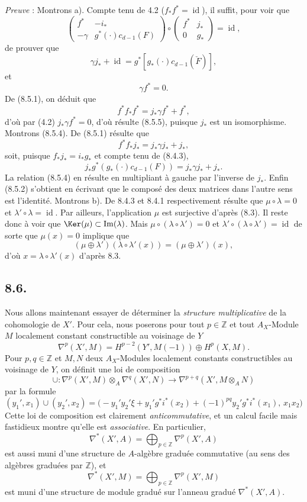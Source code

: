 \emph{Preuve} : Montrons a). Compte tenu de 4.2 ($f_*f^*=\operatorname{id}$), il suffit, pour voir que
\[
\begin{pmatrix}
f^*&-i_*\\
-\gamma&g^*(\cdot)c_{d-1}(F)
\end{pmatrix}
\circ
\begin{pmatrix}
f^*&j_*\\
0&g_*
\end{pmatrix}
=\operatorname{id},
\]
de prouver que
\[
\gamma j_*+\operatorname{id}=g^*[g_*(\cdot)c_{d-1}(\check F)],
\tag{8.5.4}
\]
et
\[
\gamma f^*=0.
\tag{8.5.5}
\]
De (8.5.1), on déduit que
\[
f^*f_*f^*=j_*\gamma f^*+f^*,
\]
d'où par (4.2) $j_*\gamma f^*=0$, d'où résulte (8.5.5), puisque $j_*$ est un isomorphisme. Montrons (8.5.4). De (8.5.1) résulte que
\[
f^*f_*j_*=j_*\gamma j_*+j_*,
\]
soit, puisque $f_*j_*=i_*g_*$ et compte tenu de (8.4.3),
\[
j_*g^*(g_*(\cdot)c_{d-1}(F))=j_*\gamma j_*+j_*.
\]
La relation (8.5.4) en résulte en multipliant à gauche par l'inverse de $j_*$. Enfin (8.5.2) s'obtient en écrivant que le composé des deux matrices dans l'autre sens est l'identité. Montrons b). De 8.4.3 et 8.4.1 respectivement résulte que $\mu\circ\lambda=0$ et $\lambda'\circ\lambda=\operatorname{id}$. Par ailleurs, l'application $\mu$ est surjective d'après (8.3). Il reste donc à voir que $\Ker(\mu)\subset\operatorname{Im}(\lambda)$. Mais $\mu\circ(\lambda\circ\lambda')=0$ et $\lambda'\circ(\lambda\circ\lambda')=\operatorname{id}$ de sorte que $\mu(x)=0$ implique que
\[
(\mu\oplus\lambda')(\lambda\circ\lambda'(x))=(\mu\oplus\lambda')(x),
\]
d'où $x=\lambda\circ\lambda'(x)$ d'après 8.3.

\subsection*{8.6.}

Nous allons maintenant essayer de déterminer la \emph{structure multiplicative} de la cohomologie de $X'$. Pour cela, nous poserons pour tout $p\in\mathbb{Z}$ et tout $A_X$-Module $M$ localement constant constructible au voisinage de $Y$
\[
\nabla^p(X',M)=H^{p-2}(Y',M(-1))\oplus H^p(X,M).
\]
Pour $p,q\in\mathbb{Z}$ et $M,N$ deux $A_X$-Modules localement constants constructibles au voisinage de $Y$, on définit une loi de composition
\[
\cup:\nabla^p(X',M)\otimes_A\nabla^q(X',N)\to
\nabla^{p+q}(X',M\otimes_A N)
\tag{8.6.1}
\]
par la formule
\[
(y_1',x_1)\cup(y_2',x_2)=
\bigl(-y_1'y_2'\xi+y_1'g^*i^*(x_2)+(-1)^{pq}y_2'g^*i^*(x_1),\,x_1x_2\bigr)
\tag{8.6.2}
\]
Cette loi de composition est clairement \emph{anticommutative}, et un calcul facile mais fastidieux montre qu'elle est \emph{associative}. En particulier,
\[
\nabla^*(X',A)=\bigoplus_{p\in\mathbb{Z}}\nabla^p(X',A)
\]
est
aussi muni d'une structure de $A$-algèbre graduée commutative (au sens des algèbres graduées par $\mathbb{Z}$), et
\[
\nabla^*(X',M)=\bigoplus_{p\in\mathbb{Z}}\nabla^p(X',M)
\]
est muni d'une structure de module gradué sur l'anneau gradué $\nabla^*(X',A)$.

